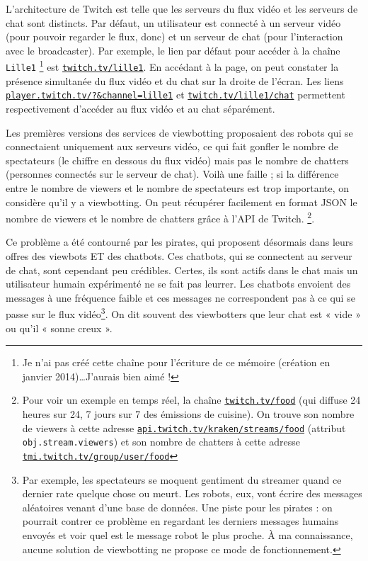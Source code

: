 \documentclass[a4paper]{article}
\begin{document}
L'architecture de Twitch est telle que les serveurs du flux vidéo et les serveurs de chat sont distincts. Par défaut, un utilisateur est connecté à un serveur vidéo (pour pouvoir regarder le flux, donc) et un serveur de chat (pour l'interaction avec le broadcaster). Par exemple, le lien par défaut pour accéder à la chaîne \texttt{Lille1} \footnote{Je n'ai pas créé cette chaîne pour l'écriture de ce mémoire (création en janvier 2014)\ldots J'aurais bien aimé !} est \href{https://www.twitch.tv/lille1}{\texttt{twitch.tv/lille1}}. En accédant à la page, on peut constater la présence simultanée du flux vidéo et du chat sur la droite de l'écran. Les liens \href{https://player.twitch.tv/?\&channel=lille1}{\texttt{player.twitch.tv/?\&channel=lille1}} et \href{https://www.twitch.tv/lille1/chat}{\texttt{twitch.tv/lille1/chat}} permettent respectivement d'accéder au flux vidéo et au chat séparément.

Les premières versions des services de viewbotting proposaient des robots qui se connectaient uniquement aux serveurs vidéo, ce qui fait gonfler le nombre de spectateurs (le chiffre en dessous du flux vidéo) mais pas le nombre de chatters (personnes connectés sur le serveur de chat). Voilà une faille ; si la différence entre le nombre de viewers et le nombre de spectateurs est trop importante, on considère qu'il y a viewbotting. On peut récupérer facilement en format JSON le nombre de viewers et le nombre de chatters grâce à l'API de Twitch. \footnote{Pour voir un exemple en temps réel, la chaîne \href{https://www.twitch.tv/food}{\texttt{twitch.tv/food}} (qui diffuse 24 heures sur 24, 7 jours sur 7 des émissions de cuisine). On trouve son nombre de viewers à cette adresse \href{https://api.twitch.tv/kraken/streams/food}{\texttt{api.twitch.tv/kraken/streams/food}} (attribut \texttt{obj.stream.viewers}) et son nombre de chatters à cette adresse \href{http://tmi.twitch.tv/group/user/food}{\texttt{tmi.twitch.tv/group/user/food}}}.

Ce problème a été contourné par les pirates, qui proposent désormais dans leurs offres des viewbots ET des chatbots. Ces chatbots, qui se connectent au serveur de chat, sont cependant peu crédibles. Certes, ils sont actifs dans le chat mais un utilisateur humain expérimenté ne se fait pas leurrer. Les chatbots envoient des messages à une fréquence faible et ces messages ne correspondent pas à ce qui se passe sur le flux vidéo\footnote{Par exemple, les spectateurs se moquent gentiment du streamer quand ce dernier rate quelque chose ou meurt. Les robots, eux, vont écrire des messages aléatoires venant d'une base de données. Une piste pour les pirates : on pourrait contrer ce problème en regardant les derniers messages humains envoyés et voir quel est le message robot le plus proche. À ma connaissance, aucune solution de viewbotting ne propose ce mode de fonctionnement.}. On dit souvent des viewbotters que leur chat est « vide » ou qu'il « sonne creux ».
\end{document}
